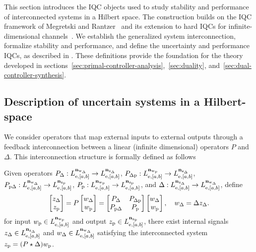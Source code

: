 This section introduces the IQC objects used to study stability and performance
of interconnected systems in a Hilbert space. The construction builds on the
IQC framework of Megretski and Rantzer~\cite{megretski1997system} and its
extension to hard IQCs for infinite-dimensional
channels~\cite{10156335}. We establish the generalized
system interconnection, formalize stability and performance, and define the
uncertainty and performance IQCs, as described in \cite{lenssen2025muanalysissynthesisframeworkpartial}. These definitions provide the foundation for
the theory developed in sections~\ref{sec:primal-controller-analysis},~\ref{sec:duality}, and~\ref{sec:dual-controller-synthesis}.

\subsection{Description of uncertain systems in a Hilbert-space}
We consider operators that map external inputs to external outputs through a
feedback interconnection between a linear (infinite dimensional) operators $P$
and $\Delta$.
This interconnection structure is formally defined as follows
\begin{definition}\label{def:uncertain-interconnection}
Given operators
$P_\Delta :
L_{{\mathrm{e}},[a,b]}^{\mathbf{n}_{{\mathrm{w}}_\Delta}}
\to
L_{{\mathrm{e}},[a,b]}^{\mathbf{n}_{{\mathrm{z}}_\Delta}}$,
$P_{\Delta{\mathrm{p}}} :
L_{{\mathrm{e}},[a,b]}^{\mathbf{n}_{{\mathrm{w}}_{{\mathrm{p}}}}}
\to
L_{{\mathrm{e}},[a,b]}^{\mathbf{n}_{{\mathrm{z}}_\Delta}}$,
$P_{{\mathrm{p}}\Delta} :
L_{{\mathrm{e}},[a,b]}^{\mathbf{n}_{{\mathrm{w}}_\Delta}}
\to
L_{{\mathrm{e}},[a,b]}^{\mathbf{n}_{{\mathrm{z}}_{{\mathrm{p}}}}}$,
$P_{{\mathrm{p}}} :
L_{{\mathrm{e}},[a,b]}^{\mathbf{n}_{{\mathrm{w}}_{{\mathrm{p}}}}}
\to
L_{{\mathrm{e}},[a,b]}^{\mathbf{n}_{{\mathrm{z}}_{{\mathrm{p}}}}}$,
and $\Delta :
L_{{\mathrm{e}},[a,b]}^{\mathbf{n}_{{\mathrm{z}}_\Delta}}
\to
L_{{\mathrm{e}},[a,b]}^{\mathbf{n}_{{\mathrm{w}}_\Delta}}$, define
\begin{equation}\label{eq:uncertain-map}
\begin{bmatrix}z_\Delta\\ z_{{\mathrm{p}}}\end{bmatrix}
= P\begin{bmatrix}w_\Delta\\ w_{{\mathrm{p}}}\end{bmatrix} =
\begin{bmatrix}
P_\Delta & P_{\Delta{\mathrm{p}}} \\
P_{{\mathrm{p}}\Delta} & P_{{\mathrm{p}}}
\end{bmatrix}\begin{bmatrix}w_\Delta\\ w_{{\mathrm{p}}}\end{bmatrix},
\quad
w_\Delta=\Delta z_\Delta.
\end{equation}
for input $w_{{\mathrm{p}}} \in L_{{\mathrm{e}},[a,b]}^{\mathbf{n}_{{\mathrm{w}}_{{\mathrm{p}}}}}$ and output
$z_{{\mathrm{p}}}\in L_{{\mathrm{e}},[a,b]}^{\mathbf{n}_{{\mathrm{z}}_{{\mathrm{p}}}}}$, there exist internal signals
$z_\Delta \in L_{{\mathrm{e}},[a,b]}^{\mathbf{n}_{{\mathrm{z}}_\Delta}}$ and
$w_\Delta \in L_{{\mathrm{e}},[a,b]}^{\mathbf{n}_{{\mathrm{w}}_\Delta}}$
satisfying the {interconnected system} $z_{{\mathrm{p}}}= (P\star\Delta)w_{{\mathrm{p}}}$.
\end{definition}
